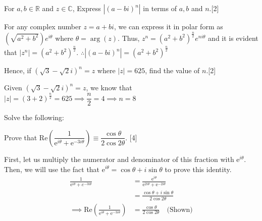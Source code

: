 \documentclass[12pt, a4 paper]{article}
\begin{document}
\begin{outline}[enumerate]
	\2 For $a,b \in \mathbb{R}$ and $z \in \mathbb{C}$, %
	\3 Express $|(a-bi)^n|$ in terms of $a,b$ and $n$.\hfill[2]
	\begin{answer}
		For any complex number $z=a+bi$, we can express it in polar form as $(\sqrt{a^2+b^2})e^{i\theta}$ where $\theta=\arg{(z)}$. Thus, $z^n=(a^2+b^2)^\frac{n}{2}e^{ni\theta}$ and it is evident that $|z^n| =(a^2+b^2)^\frac{n}{2}$. $\therefore |(a-bi)^n|=(a^2+b^2)^\frac{n}{2}$
	\end{answer}
	\3 Hence, if $(\sqrt{3}-\sqrt{2}i)^n=z$ where $|z|=625$, find the value of $n$.\hfill[2]
	\begin{answer}
		Given $(\sqrt{3}-\sqrt{2}i)^n=z$, we know that $|z|=(3+2)^\frac{n}{2}=625 \implies \dfrac{n}{2}=4 \implies n=8$
	\end{answer}
			        
	\1 Solve the following: %
			            
	\2 Prove that Re$(\dfrac{1}{\mathrm{e}^{i\theta}+\mathrm{e}^{-3i\theta}}) \equiv \dfrac{\cos{\theta}}{2\cos{2\theta}}$. \hfill[4] %
	\begin{answer}
		First, let us multiply the numerator and denominator of this fraction with $\mathrm{e}^{i\theta}$. Then, we will use the fact that $\mathrm{e}^{i\theta}=\cos\theta+i\sin\theta$ to prove this identity.
		\begin{align*}
			\frac{1}{\mathrm{e}^{i\theta}+e^{-3i\theta}}                                & = \frac{\mathrm{\mathrm{e}}^{i\theta}}{\mathrm{e}^{2i\theta}+\mathrm{e}^{-2i\theta}} \\
			                                                                            & = \frac{\cos\theta+i\sin\theta}{2\cos2\theta}                                        \\
			\implies \textrm{Re}(\frac{1}{\mathrm{e}^{i\theta}+\mathrm{e}^{-3i\theta}}) & =\frac{\cos{\theta}}{2\cos{2\theta}}\quad\textrm{(Shown)}                            
		\end{align*}
	\end{answer}
			   

\end{outline}
\end{document}
